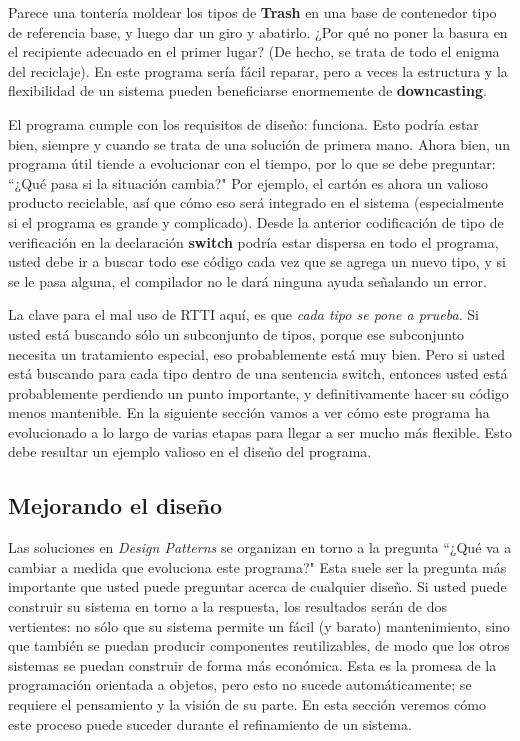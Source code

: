 Parece una tontería moldear los tipos de \textbf{Trash} en una base de contenedor tipo de referencia base, y luego dar un giro y abatirlo. ¿Por qué no poner la basura en el recipiente adecuado en el primer lugar? (De hecho, se trata de todo el enigma del reciclaje). 
En este programa sería fácil reparar, pero a veces la estructura y la flexibilidad de un sistema pueden beneficiarse enormemente de \textbf{downcasting}.     \newline

El programa cumple con los requisitos de diseño: funciona. Esto podría estar bien, siempre y cuando se trata de una solución de primera mano. Ahora bien, un programa útil tiende a evolucionar con el tiempo, por lo que se debe preguntar: “¿Qué pasa si la situación cambia?" Por ejemplo, el cartón es ahora un valioso producto reciclable, así que cómo eso será integrado en el sistema (especialmente si el programa es grande y complicado). Desde la anterior codificación de tipo de verificación en la declaración \textbf{switch} podría estar dispersa en todo el programa, usted debe ir a buscar todo ese código cada vez que se agrega un nuevo tipo, y si se le pasa alguna, el compilador no le dará ninguna ayuda señalando un error.  \newline

La clave para el mal uso de RTTI aquí, es que \textit{cada tipo se pone a prueba}. Si usted está buscando sólo un subconjunto de tipos, porque ese subconjunto necesita un tratamiento especial, eso probablemente está muy bien. Pero si usted está buscando para cada tipo dentro de una sentencia switch, entonces usted está probablemente perdiendo un punto importante, y definitivamente hacer su código menos mantenible. En la siguiente sección vamos a ver cómo este programa ha evolucionado a lo largo de varias etapas para llegar a ser mucho más flexible. Esto debe resultar un ejemplo valioso en el diseño del programa.     \newline



\subsection*{Mejorando el diseño}
\label{subsec:med}



Las soluciones en \textit{Design Patterns} se organizan en torno a la pregunta “¿Qué va a cambiar a medida que evoluciona este programa?" Esta suele ser la pregunta más importante que usted puede preguntar acerca de cualquier diseño. Si usted puede construir su sistema en torno a la respuesta, los resultados serán de dos vertientes: no sólo que su sistema permite un fácil (y barato) mantenimiento, sino que también se puedan producir componentes reutilizables, de modo que los otros sistemas se puedan construir de forma más económica. Esta es la promesa de la programación orientada a objetos, pero esto no sucede automáticamente; se requiere el pensamiento y la visión de su parte. En esta sección veremos cómo este proceso puede suceder durante el refinamiento de un sistema.    \newline


